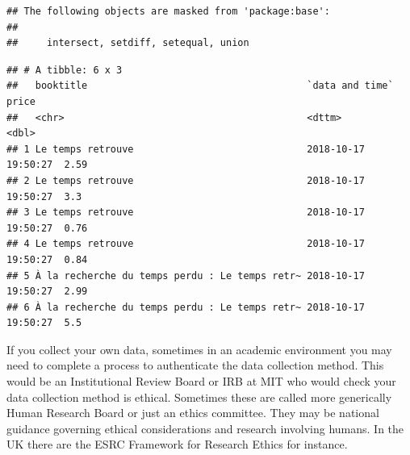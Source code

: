 \documentclass[]{book}
\newenvironment{Shaded}{\begin{snugshade}}{\end{snugshade}}
\newcommand{\KeywordTok}[1]{\textcolor[rgb]{0.13,0.29,0.53}{\textbf{#1}}}
\newcommand{\StringTok}[1]{\textcolor[rgb]{0.31,0.60,0.02}{#1}}
\newcommand{\OperatorTok}[1]{\textcolor[rgb]{0.81,0.36,0.00}{\textbf{#1}}}
\newcommand{\NormalTok}[1]{#1}
\theoremstyle{definition}
\theoremstyle{definition}
\theoremstyle{definition}
\theoremstyle{remark}
\begin{document}
\begin{verbatim}
## The following objects are masked from 'package:base':
## 
##     intersect, setdiff, setequal, union
\end{verbatim}

\begin{Shaded}
\end{Shaded}

\begin{verbatim}
## # A tibble: 6 x 3
##   booktitle                                      `data and time`     price
##   <chr>                                          <dttm>              <dbl>
## 1 Le temps retrouve                              2018-10-17 19:50:27  2.59
## 2 Le temps retrouve                              2018-10-17 19:50:27  3.3 
## 3 Le temps retrouve                              2018-10-17 19:50:27  0.76
## 4 Le temps retrouve                              2018-10-17 19:50:27  0.84
## 5 À la recherche du temps perdu : Le temps retr~ 2018-10-17 19:50:27  2.99
## 6 À la recherche du temps perdu : Le temps retr~ 2018-10-17 19:50:27  5.5
\end{verbatim}

If you collect your own data, sometimes in an academic environment you
may need to complete a process to authenticate the data collection
method. This would be an Institutional Review Board or IRB at MIT who
would check your data collection method is ethical. Sometimes these are
called more generically Human Research Board or just an ethics
committee. They may be national guidance governing ethical
considerations and research involving humans. In the UK there are the
ESRC Framework for Research Ethics for instance.
\end{document}
